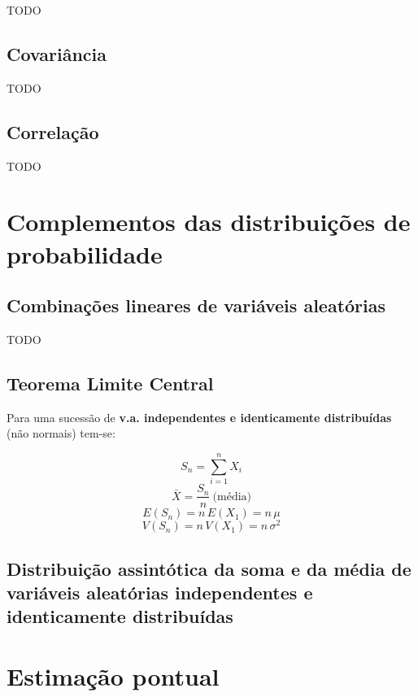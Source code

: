 \documentclass[11pt, a4paper]{article}
\begin{document}
TODO

\subsection{Covariância}

TODO

\subsection{Correlação}

TODO

\newpage
\section{Complementos das distribuições de probabilidade}

\subsection{Combinações lineares de variáveis aleatórias}

TODO

\subsection{Teorema Limite Central}

Para uma sucessão de \textbf{v.a. independentes e identicamente distribuídas} (não normais) tem-se:

\begin{equation*}
    S_n = \sum_{i=1}^{n} X_i
\end{equation*}
\begin{equation*}
    \bar{X} = \frac{S_n}{n} \ \text{(média)}
\end{equation*}
\begin{equation*}
    E(S_n) = n \, E(X_1) = n \, \mu
\end{equation*}
\begin{equation*}
    V(S_n) = n \, V(X_1) = n \, \sigma^2
\end{equation*}

\subsection{Distribuição assintótica da soma e da média de variáveis aleatórias independentes e identicamente distribuídas}

\vspace{20pt}
\section{Estimação pontual}
\end{document}
